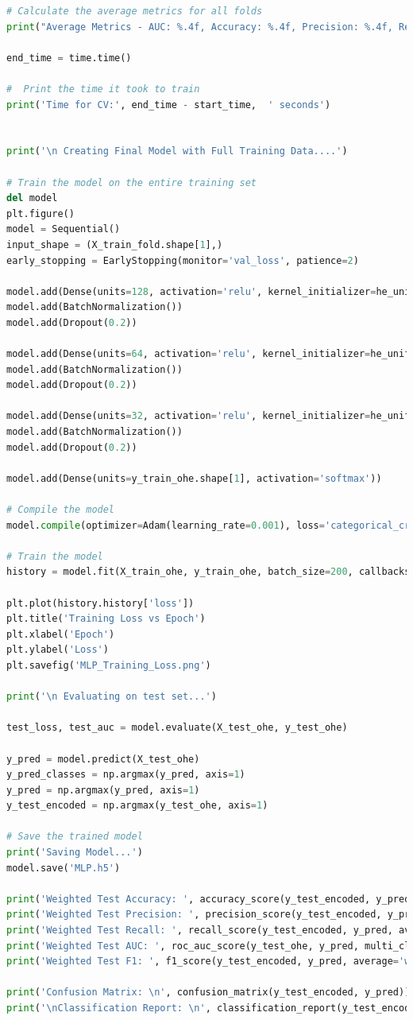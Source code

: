 \begin{appendices}
\begin{lstlisting}[language=Python]
# Calculate the average metrics for all folds
print("Average Metrics - AUC: %.4f, Accuracy: %.4f, Precision: %.4f, Recall: %.4f, F1: %.4f" % (np.mean(auc_scores), np.mean(accuracy_scores), np.mean(precision_scores), np.mean(recall_scores), np.mean(f1_scores)))

end_time = time.time()

#  Print the time it took to train
print('Time for CV:', end_time - start_time,  ' seconds')


print('\n Creating Final Model with Full Training Data....')

# Train the model on the entire training set
del model
plt.figure()
model = Sequential()
input_shape = (X_train_fold.shape[1],)
early_stopping = EarlyStopping(monitor='val_loss', patience=2)

model.add(Dense(units=128, activation='relu', kernel_initializer=he_uniform(), input_shape=input_shape))
model.add(BatchNormalization())
model.add(Dropout(0.2))

model.add(Dense(units=64, activation='relu', kernel_initializer=he_uniform()))
model.add(BatchNormalization())
model.add(Dropout(0.2))

model.add(Dense(units=32, activation='relu', kernel_initializer=he_uniform()))
model.add(BatchNormalization())
model.add(Dropout(0.2))

model.add(Dense(units=y_train_ohe.shape[1], activation='softmax'))

# Compile the model
model.compile(optimizer=Adam(learning_rate=0.001), loss='categorical_crossentropy', metrics=[AUC()])

# Train the model
history = model.fit(X_train_ohe, y_train_ohe, batch_size=200, callbacks=[early_stopping], epochs=20)

plt.plot(history.history['loss'])
plt.title('Training Loss vs Epoch')
plt.xlabel('Epoch')
plt.ylabel('Loss')
plt.savefig('MLP_Training_Loss.png')

print('\n Evaluating on test set...')

test_loss, test_auc = model.evaluate(X_test_ohe, y_test_ohe)

y_pred = model.predict(X_test_ohe)
y_pred_classes = np.argmax(y_pred, axis=1)
y_pred = np.argmax(y_pred, axis=1)
y_test_encoded = np.argmax(y_test_ohe, axis=1)

# Save the trained model
print('Saving Model...')
model.save('MLP.h5')

print('Weighted Test Accuracy: ', accuracy_score(y_test_encoded, y_pred))
print('Weighted Test Precision: ', precision_score(y_test_encoded, y_pred, average='weighted'))
print('Weighted Test Recall: ', recall_score(y_test_encoded, y_pred, average='weighted'))
print('Weighted Test AUC: ', roc_auc_score(y_test_ohe, y_pred, multi_class='ovr'))
print('Weighted Test F1: ', f1_score(y_test_encoded, y_pred, average='weighted'))

print('Confusion Matrix: \n', confusion_matrix(y_test_encoded, y_pred))
print('\nClassification Report: \n', classification_report(y_test_encoded, y_pred))
\end{lstlisting}

\end{appendices}


